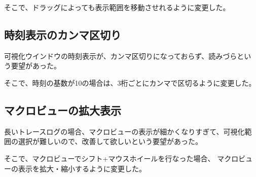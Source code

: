 そこで、ドラッグによっても表示範囲を移動させれるように変更した。

\subsection{時刻表示のカンマ区切り}
可視化ウインドウの時刻表示が、カンマ区切りになっておらず、読みづらとい
う要望があった。

そこで、時刻の基数が10の場合は、3桁ごとにカンマで区切るように変更した。

\subsection{マクロビューの拡大表示}
長いトレースログの場合、マクロビューの表示が細かくなりすぎて、可視化範
囲の選択が難しいので、改善して欲しいという要望があった。

そこで、マクロビューでシフト+マウスホイールを行なった場合、
マクロビューの表示を拡大・縮小するように変更した。
